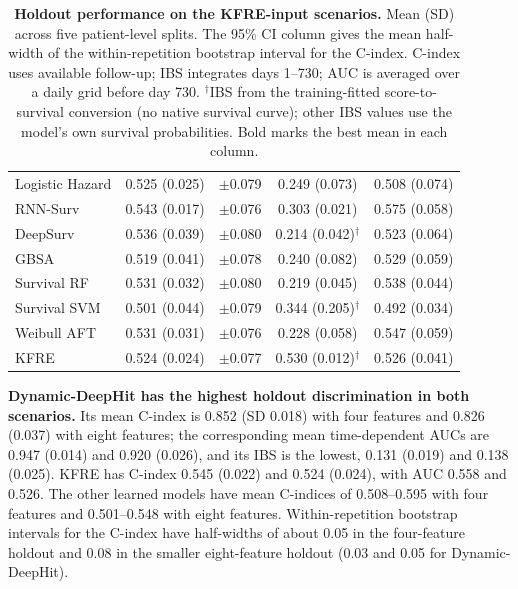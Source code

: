 \documentclass[10pt,letterpaper]{article}
\begin{document}
\begin{table}[h!]
\begin{tabular}{@{}lcccc@{}}
Logistic Hazard & 0.525 (0.025) & $\pm$0.079 & 0.249 (0.073) & 0.508 (0.074) \\
RNN-Surv & 0.543 (0.017) & $\pm$0.076 & 0.303 (0.021) & 0.575 (0.058) \\
DeepSurv & 0.536 (0.039) & $\pm$0.080 & 0.214 (0.042)$^{\dagger}$ & 0.523 (0.064) \\
GBSA & 0.519 (0.041) & $\pm$0.078 & 0.240 (0.082) & 0.529 (0.059) \\
Survival RF & 0.531 (0.032) & $\pm$0.080 & 0.219 (0.045) & 0.538 (0.044) \\
Survival SVM & 0.501 (0.044) & $\pm$0.079 & 0.344 (0.205)$^{\dagger}$ & 0.492 (0.034) \\
Weibull AFT & 0.531 (0.031) & $\pm$0.076 & 0.228 (0.058) & 0.547 (0.059) \\
KFRE & 0.524 (0.024) & $\pm$0.077 & 0.530 (0.012)$^{\dagger}$ & 0.526 (0.041) \\
\bottomrule
\end{tabular}
\caption{{\bf Holdout performance on the KFRE-input scenarios.} Mean (SD) across five patient-level splits. The 95\% CI column gives the mean half-width of the within-repetition bootstrap interval for the C-index. C-index uses available follow-up; IBS integrates days 1--730; AUC is averaged over a daily grid before day 730. $^{\dagger}$IBS from the training-fitted score-to-survival conversion (no native survival curve); other IBS values use the model's own survival probabilities. Bold marks the best mean in each column.}
\label{tab:discrimination}
\end{table}

\textbf{Dynamic-DeepHit has the highest holdout discrimination in both scenarios.} Its mean C-index is 0.852 (SD 0.018) with four features and 0.826 (0.037) with eight features; the corresponding mean time-dependent AUCs are 0.947 (0.014) and 0.920 (0.026), and its IBS is the lowest, 0.131 (0.019) and 0.138 (0.025). KFRE has C-index 0.545 (0.022) and 0.524 (0.024), with AUC 0.558 and 0.526. The other learned models have mean C-indices of 0.508--0.595 with four features and 0.501--0.548 with eight features. Within-repetition bootstrap intervals for the C-index have half-widths of about 0.05 in the four-feature holdout and 0.08 in the smaller eight-feature holdout (0.03 and 0.05 for Dynamic-DeepHit).
\end{document}
